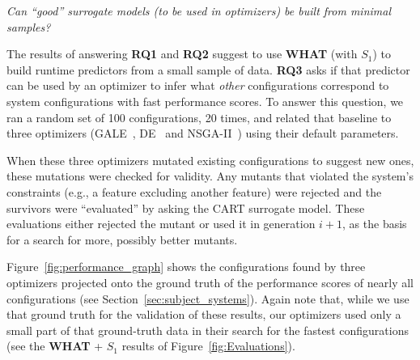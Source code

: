 \documentclass{newsig}
\newcommand{\fig}[1]{Figure~\ref{fig:#1}}
\newcommand{\what}{{\bf WHAT }}
\begin{document}
\begin{center}
{\em
Can ``good'' surrogate models (to be used in optimizers)
be built from minimal samples?}
\end{center}

The results of answering {\bf RQ1} and {\bf RQ2} suggest to use \what (with $S_1$) to build runtime predictors from a small sample of  data. {\bf RQ3}
asks if that predictor can be used by an optimizer to infer what {\em other} configurations correspond to system configurations with fast performance scores.
To answer this question,  we ran  a random set of 100 
configurations, 20 times, and related that baseline to three optimizers (GALE~\cite{krall2014gale}, DE~\cite{storn1997differential} and  NSGA-II~\cite{deb00afast}) using their
default parameters.
 
When these three optimizers mutated existing configurations to suggest new ones,
these mutations were checked for validity. Any mutants that violated the system's constraints (e.g., a feature excluding another feature) were rejected
and the survivors were ``evaluated'' by asking the CART surrogate model.
These evaluations either rejected the mutant or used it in generation $i+1$, as the basis for a search for more, possibly
better  mutants.




\fig{performance_graph} shows the configurations found by three optimizers projected onto the ground truth of the performance scores of nearly
all configurations (see Section~\ref{sec:subject_systems}). Again note that, while we use that ground truth for the validation of these results, our optimizers 
used only a small part of that ground-truth data in their search for the fastest configurations (see the \what + $S_1$
results of \fig{Evaluations}).
\end{document}
